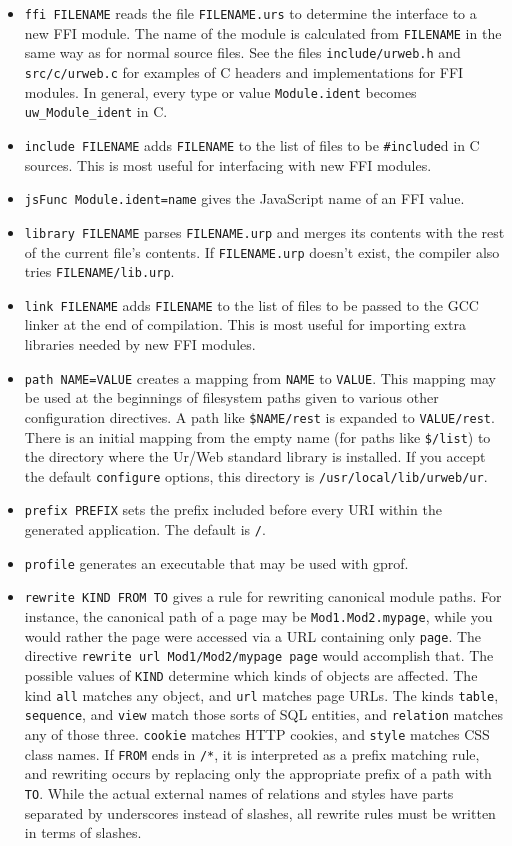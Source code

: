 \documentclass{article}
\begin{document}
\begin{itemize}
\item \texttt{ffi FILENAME} reads the file \texttt{FILENAME.urs} to determine the interface to a new FFI module.  The name of the module is calculated from \texttt{FILENAME} in the same way as for normal source files.  See the files \texttt{include/urweb.h} and \texttt{src/c/urweb.c} for examples of C headers and implementations for FFI modules.  In general, every type or value \texttt{Module.ident} becomes \texttt{uw\_Module\_ident} in C.
\item \texttt{include FILENAME} adds \texttt{FILENAME} to the list of files to be \texttt{\#include}d in C sources.  This is most useful for interfacing with new FFI modules.
\item \texttt{jsFunc Module.ident=name} gives the JavaScript name of an FFI value.
\item \texttt{library FILENAME} parses \texttt{FILENAME.urp} and merges its contents with the rest of the current file's contents.  If \texttt{FILENAME.urp} doesn't exist, the compiler also tries \texttt{FILENAME/lib.urp}.
\item \texttt{link FILENAME} adds \texttt{FILENAME} to the list of files to be passed to the GCC linker at the end of compilation.  This is most useful for importing extra libraries needed by new FFI modules.
\item \texttt{path NAME=VALUE} creates a mapping from \texttt{NAME} to \texttt{VALUE}.  This mapping may be used at the beginnings of filesystem paths given to various other configuration directives.  A path like \texttt{\$NAME/rest} is expanded to \texttt{VALUE/rest}.  There is an initial mapping from the empty name (for paths like \texttt{\$/list}) to the directory where the Ur/Web standard library is installed.  If you accept the default \texttt{configure} options, this directory is \texttt{/usr/local/lib/urweb/ur}.
\item \texttt{prefix PREFIX} sets the prefix included before every URI within the generated application.  The default is \texttt{/}.
\item \texttt{profile} generates an executable that may be used with gprof.
\item \texttt{rewrite KIND FROM TO} gives a rule for rewriting canonical module paths.  For instance, the canonical path of a page may be \texttt{Mod1.Mod2.mypage}, while you would rather the page were accessed via a URL containing only \texttt{page}.  The directive \texttt{rewrite url Mod1/Mod2/mypage page} would accomplish that.  The possible values of \texttt{KIND} determine which kinds of objects are affected.  The kind \texttt{all} matches any object, and \texttt{url} matches page URLs.  The kinds \texttt{table}, \texttt{sequence}, and \texttt{view} match those sorts of SQL entities, and \texttt{relation} matches any of those three.  \texttt{cookie} matches HTTP cookies, and \texttt{style} matches CSS class names.  If \texttt{FROM} ends in \texttt{/*}, it is interpreted as a prefix matching rule, and rewriting occurs by replacing only the appropriate prefix of a path with \texttt{TO}.  While the actual external names of relations and styles have parts separated by underscores instead of slashes, all rewrite rules must be written in terms of slashes.

\end{itemize}
\end{document}
